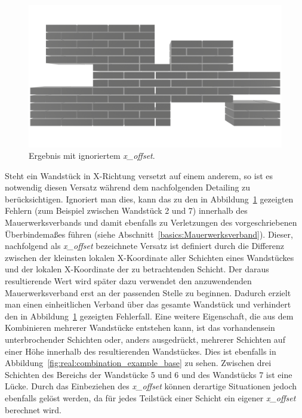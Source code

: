 \begin{figure}[hb!]
  \centering
  \includegraphics[width=0.8\columnwidth]{fig/Real_Combination_Output_No_XOffsetpng.png}
  \caption{Ergebnis mit ignoriertem \textit{x\_offset}.}
  \label{fig:real:combination_example_solution_no_xoffset}
\end{figure}

Steht ein Wandstück in X-Richtung versetzt auf einem anderem, so ist es notwendig diesen Versatz während dem nachfolgenden Detailing zu berücksichtigen.
Ignoriert man dies, kann das zu den in Abbildung~\ref{fig:real:combination_example_solution_no_xoffset} gezeigten Fehlern (zum Beispiel zwischen Wandstück 2 und 7) innerhalb des Mauerwerksverbands und damit ebenfalls zu Verletzungen des vorgeschriebenen Überbindemaßes führen (siehe Abschnitt~\ref*{basics:Mauerwerksverband}).
Dieser, nachfolgend als \textit{x\_offset} bezeichnete Versatz ist definiert durch die Differenz zwischen der kleinsten lokalen X-Koordinate aller Schichten eines Wandstückes und der lokalen X-Koordinate der zu betrachtenden Schicht.
Der daraus resultierende Wert wird später dazu verwendet den anzuwendenden Mauerwerksverband erst an der passenden Stelle zu beginnen.
Dadurch erzielt man einen einheitlichen Verband über das gesamte Wandstück und verhindert den in Abbildung~\ref{fig:real:combination_example_solution_no_xoffset} gezeigten Fehlerfall.
Eine weitere Eigenschaft, die aus dem Kombinieren mehrerer Wandstücke entstehen kann, ist das vorhandensein unterbrochender Schichten oder, anders ausgedrückt, mehrerer Schichten auf einer Höhe innerhalb des resultierenden Wandstückes.
Dies ist ebenfalls in Abbildung~\ref{fig:real:combination_example_base} zu sehen. 
Zwischen drei Schichten des Bereichs der Wandstücke 5 und 6 und des Wandstücks 7 ist eine Lücke.
Durch das Einbeziehen des \textit{x\_offset} können derartige Situationen jedoch ebenfalls gelöst werden, da für jedes Teilstück einer Schicht ein eigener \textit{x\_offset} berechnet wird.

